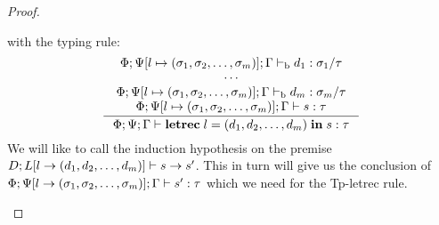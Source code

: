 \documentclass[a4paper, oneside, 10pt, draft]{memoir}
\begin{document}
\begin{proof}
\begin{itemize}
\begin{equation*}
      \end{equation*}
    with the typing rule:
        \begin{equation}
          \label{eq:preserv-tp-letrec-s}
          \inference{\Phi;\Psi[l \mapsto \bbtypes];\Gamma \tpb d_1 :
            \sigma_1 / \tau\\
            \dotsb\\
            \Phi;\Psi[l \mapsto \bbtypes];\Gamma \tpb d_m : \sigma_m
            / \tau\\
            \Phi;\Psi[l \mapsto \bbtypes];\Gamma |- s : \tau}
          {\Phi;\Psi;\Gamma |- \iletrec{l}{\dbundle}{s} : \tau}\\\\
    \end{equation}
    We will like to call the induction hypothesis on the premise
    $D;L[l -> (d_1, d_2, \dotsc, d_m)] |- s -> s'$. This in turn will give us the
    conclusion of $\Phi;\Psi[l -> (\sigma_1, \sigma_2, \dotsc, \sigma_m)];\Gamma |- s' : \tau$
    which we need for the Tp-letrec rule.


\end{itemize}
\end{proof}
\end{document}
